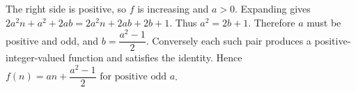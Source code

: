 The right side is positive, so $f$ is increasing and $a>0$. Expanding gives $2a^2n+a^2+2ab=2a^2n+2ab+2b+1$. Thus $a^2=2b+1$. Therefore $a$ must be positive and odd, and $b = \dfrac{a^2-1}{2}$. Conversely each such pair produces a positive-integer-valued function and satisfies the identity. Hence $\boxed{f (n) = a n + \dfrac{a^2-1}{2} \text{ for positive odd } a}$.
